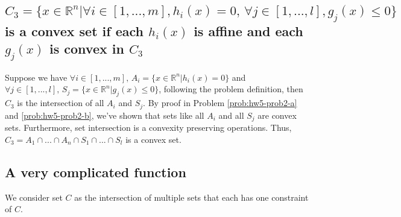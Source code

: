 \subsection{$C_3=\{x\in \mathbb{R}^n | \forall i \in [1,...,m], h_i(x) = 0, \, \forall j \in [1,...,l], g_j(x) \leq 0\}$ is a convex set if each $h_i(x)$ is affine and each $g_j(x)$ is convex in $C_3$}

Suppose we have $\forall i \in [1,...,m],\, A_i = \{x\in \mathbb{R}^n | h_i(x)=0\}$ and $\forall j \in [1,...,l],\, S_j=\{x\in \mathbb{R}^n | g_j(x)\leq 0\}$, following the problem definition, then $C_3$ is the intersection of all $A_i$ and $S_j$. By proof in Problem \ref{prob:hw5-prob2-a} and \ref{prob:hw5-prob2-b}, we've shown that sets like all $A_i$ and all $S_j$ are convex sets. Furthermore, set intersection is a convexity preserving operations. Thus, $C_3 = A_1 \cap...\cap A_n \cap S_1 \cap ... \cap S_l$ is a convex set. 

\subsection{A very complicated function}

We consider set $C$ as the intersection of multiple sets that each has one constraint of $C$. 


